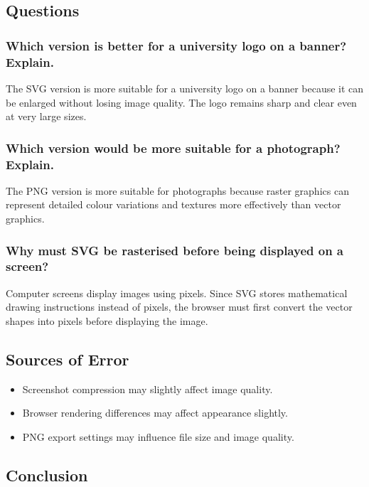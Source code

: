 \documentclass[12pt,a4paper]{article}
\begin{document}
\subsection{Questions}

\subsubsection{Which version is better for a university logo on a banner? Explain.}

The SVG version is more suitable for a university logo on a banner because it can be enlarged without losing image quality. The logo remains sharp and clear even at very large sizes.

\subsubsection{Which version would be more suitable for a photograph? Explain.}

The PNG version is more suitable for photographs because raster graphics can represent detailed colour variations and textures more effectively than vector graphics.

\subsubsection{Why must SVG be rasterised before being displayed on a screen?}

Computer screens display images using pixels. Since SVG stores mathematical drawing instructions instead of pixels, the browser must first convert the vector shapes into pixels before displaying the image.

\subsection{Sources of Error}

\begin{itemize}
    \item Screenshot compression may slightly affect image quality.
    
    \item Browser rendering differences may affect appearance slightly.
    
    \item PNG export settings may influence file size and image quality.
\end{itemize}

\subsection{Conclusion}
\end{document}
